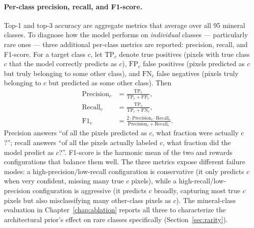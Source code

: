 \documentclass[11pt]{report}
\begin{document}
\paragraph{Per-class precision, recall, and F1-score.}
Top-1 and top-3 accuracy are aggregate metrics that average over all 95 mineral classes. To diagnose how the model performs on \emph{individual} classes --- particularly rare ones --- three additional per-class metrics are reported: precision, recall, and F1-score. For a target class $c$, let $\text{TP}_c$ denote true positives (pixels with true class $c$ that the model correctly predicts as $c$), $\text{FP}_c$ false positives (pixels predicted as $c$ but truly belonging to some other class), and $\text{FN}_c$ false negatives (pixels truly belonging to $c$ but predicted as some other class). Then
\begin{align}
\text{Precision}_c &= \frac{\text{TP}_c}{\text{TP}_c + \text{FP}_c},
\label{eq:precision} \\
\text{Recall}_c    &= \frac{\text{TP}_c}{\text{TP}_c + \text{FN}_c},
\label{eq:recall} \\
\text{F1}_c        &= \frac{2 \cdot \text{Precision}_c \cdot \text{Recall}_c}{\text{Precision}_c + \text{Recall}_c}.
\label{eq:f1}
\end{align}
Precision answers ``of all the pixels predicted as $c$, what fraction were actually $c$?''; recall answers ``of all the pixels actually labeled $c$, what fraction did the model predict as $c$?''. F1-score is the harmonic mean of the two and rewards configurations that balance them well. The three metrics expose different failure modes: a high-precision/low-recall configuration is conservative (it only predicts $c$ when very confident, missing many true $c$ pixels), while a high-recall/low-precision configuration is aggressive (it predicts $c$ broadly, capturing most true $c$ pixels but also misclassifying many other-class pixels as $c$). The mineral-class evaluation in Chapter~\ref{chap:ablation} reports all three to characterize the architectural prior's effect on rare classes specifically (Section~\ref{sec:rarity}).
\end{document}
